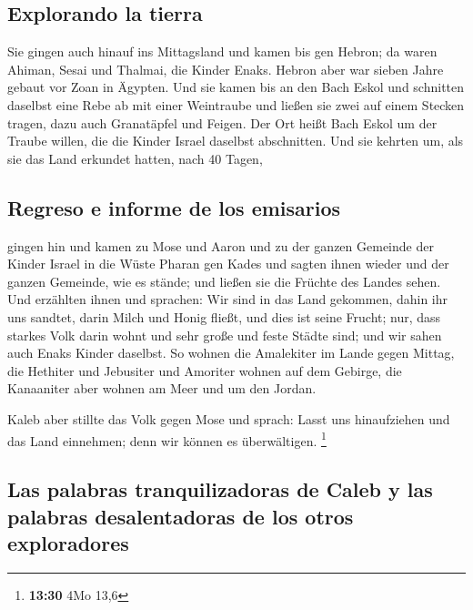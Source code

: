 \hypertarget{explorando-la-tierra}{%
\subsection{Explorando la tierra}\label{explorando-la-tierra}}

 Sie gingen auch hinauf ins Mittagsland und kamen bis gen
Hebron; da waren Ahiman, Sesai und Thalmai, die Kinder Enaks. Hebron
aber war sieben Jahre gebaut vor Zoan in Ägypten.  Und
sie kamen bis an den Bach Eskol und schnitten daselbst eine Rebe ab mit
einer Weintraube und ließen sie zwei auf einem Stecken tragen, dazu auch
Granatäpfel und Feigen.  Der Ort heißt Bach Eskol um der
Traube willen, die die Kinder Israel daselbst abschnitten.
 Und sie kehrten um, als sie das Land erkundet hatten,
nach 40 Tagen,

\hypertarget{regreso-e-informe-de-los-emisarios}{%
\subsection{Regreso e informe de los
emisarios}\label{regreso-e-informe-de-los-emisarios}}

 gingen hin und kamen zu Mose und Aaron und zu der ganzen
Gemeinde der Kinder Israel in die Wüste Pharan gen Kades und sagten
ihnen wieder und der ganzen Gemeinde, wie es stände; und ließen sie die
Früchte des Landes sehen.  Und erzählten ihnen und
sprachen: Wir sind in das Land gekommen, dahin ihr uns sandtet, darin
Milch und Honig fließt, und dies ist seine Frucht;  nur,
dass starkes Volk darin wohnt und sehr große und feste Städte sind; und
wir sahen auch Enaks Kinder daselbst.  So wohnen die
Amalekiter im Lande gegen Mittag, die Hethiter und Jebusiter und
Amoriter wohnen auf dem Gebirge, die Kanaaniter aber wohnen am Meer und
um den Jordan.

 Kaleb aber stillte das Volk gegen Mose und sprach: Lasst
uns hinaufziehen und das Land einnehmen; denn wir können es
überwältigen. \footnote{\textbf{13:30} 4Mo 13,6}

\hypertarget{las-palabras-tranquilizadoras-de-caleb-y-las-palabras-desalentadoras-de-los-otros-exploradores}{%
\subsection{Las palabras tranquilizadoras de Caleb y las palabras
desalentadoras de los otros
exploradores}\label{las-palabras-tranquilizadoras-de-caleb-y-las-palabras-desalentadoras-de-los-otros-exploradores}}

